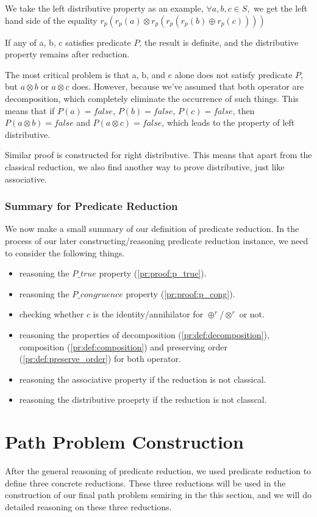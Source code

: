 \documentclass[a4paper,10pt]{article}
\begin{document}
We take the left distributive property as an example, $\forall a,b,c \in S,$ we get the left hand side of the equality $r_p(r_p(a) \otimes r_p(r_p(r_p(b) \oplus r_p(c))))$

If any of a, b, c satisfies predicate $P$, the result is definite, and the distributive property remains after reduction.

The most critical problem is that a, b, and c alone does not satisfy predicate $P$, but $a \otimes b$ or $a \otimes c$ does. However, because we've assumed that both operator are decomposition, which completely eliminate the occurrence of such things. This means that if $P(a) = false$, $P(b) = false$, $P(c) = false$, then $P(a \otimes b) = false$ and $P(a \otimes c) = false$, which leads to the property of left distributive.

Similar proof is constructed for right distributive. This means that apart from the classical reduction, we also find another way to prove distributive, just like associative.

\subsubsection{Summary for Predicate Reduction}
We now make a small summary of our definition of predicate reduction. 
In the process of our later constructing/reasoning predicate reduction instance, we need to consider the following things.
\begin{itemize}
  \item reasoning the $P\_true$ property (\ref{pr:proof:p_true}).
  \item reasoning the $P\_congruence$ property (\ref{pr:proof:p_cong}).
  \item checking whether $c$ is the identity/annihilator for $\oplus^r$/$\otimes^r$ or not.
  \item reasoning the properties of decomposition (\ref{pr:def:decomposition}), composition (\ref{pr:def:composition}) and preserving order (\ref{pr:def:preserve_order}) for both operator.
  \item reasoning the associative property if the reduction is not classical.
  \item reasoning the distributive proeprty if the reduction is not classcal.
\end{itemize}

\section{Path Problem Construction}
After the general reasoning of predicate reduction, we used predicate reduction to define three concrete reductions. These three reductions will be used in the construction of our final path problem semiring in the this section, and we will do detailed reasoning on these three reductions. 
\end{document}
